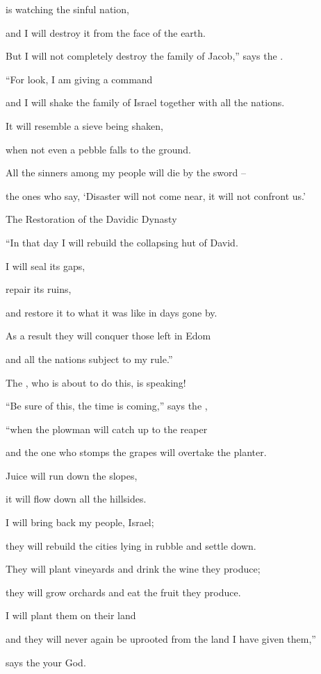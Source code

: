 {{}
is watching the sinful
nation,
\par }{\Q and I will destroy
it from the
face
of the earth.
\par }{\Q But
I will not
completely
destroy
the
family
of Jacob,”
says
the {}.
\par }{\Q {}“For
look,
I am
giving a command
\par }{\Q and I will shake
the
family
of Israel
together with all
the nations.
\par }{\Q It will resemble
a sieve
being shaken,
\par }{\Q when not
even a pebble
falls
to the ground.
\par }{\Q {}All
the sinners
among my people
will die
by the sword
–
\par }{\Q the ones who say,
‘Disaster
will not
come near,
it will not confront us.’
\par }{\SH The Restoration of the Davidic Dynasty
\par }{\Q {}“In that day
I will rebuild the collapsing
hut
of David.
\par }{\Q I will seal
its gaps,
\par }{\Q repair
its ruins,
\par }{\Q and restore
it to what it was like in days gone by.
\par }{\Q {}As a result
they will conquer
those left
in Edom
\par }{\Q and all
the nations
subject
to my rule.”
\par }{\Q The
{}, who is about to do
this,
is speaking!
\par }{\Q {}“Be sure of this,
the time
is coming,”
says
the {},
\par }{\Q “when the plowman
will catch up
to the reaper
\par }{\Q and the one who stomps
the grapes
will overtake
the planter.
\par }{\Q Juice
will run down
the slopes,
\par }{\Q it will flow down
all
the hillsides.
\par }{\Q {}I will bring back
my people,
Israel;
\par }{\Q they will rebuild
the cities
lying in rubble
and settle down.
\par }{\Q They will plant
vineyards
and drink
the
wine
they produce;
\par }{\Q they will grow orchards
and eat
the
fruit they produce.
\par }{\Q {}I will plant
them on
their land
\par }{\Q and they will never
again
be uprooted
from the land
I have
given
them,”
\par }{\PP says
the
{}
your God.
\par }